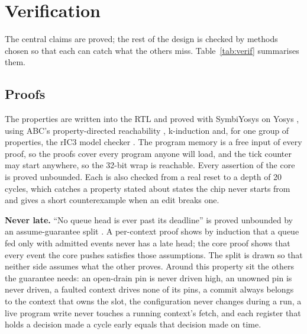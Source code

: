 \documentclass[conference,letterpaper]{IEEEtran}
\begin{document}
\section{Verification}
\label{sec:verif}

The central claims are proved; the rest of the design is checked by methods chosen so
that each can catch what the others miss. Table~\ref{tab:verif} summarises them.

\subsection{Proofs}

The properties are written into the RTL and proved with SymbiYosys \cite{sby} on Yosys
\cite{yosys}, using ABC's property-directed reachability \cite{abc,ic3,pdr}, k-induction
\cite{kinduction} and, for one group of properties, the rIC3 model checker \cite{ric3}.
The program memory is a free input of every proof, so the proofs cover every program
anyone will load, and the tick counter may start anywhere, so the 32-bit wrap is
reachable. Every assertion of the core is proved unbounded. Each is also checked from a
real reset to a depth of 20 cycles, which catches a property stated about states the
chip never starts from and gives a short counterexample when an edit breaks one.

\textbf{Never late.} ``No queue head is ever past its deadline'' is proved unbounded by an
assume-guarantee split \cite{assumeguarantee}. A per-context proof shows by induction
that a queue fed only with admitted events never has a late head; the core proof shows
that every event the core pushes satisfies those assumptions. The split is drawn so that
neither side assumes what the other proves. Around this property sit the others the
guarantee needs: an open-drain pin is never driven high, an unowned pin is never driven,
a faulted context drives none of its pins, a commit always belongs to the context that
owns the slot, the configuration never changes during a run, a live program write never
touches a running context's fetch, and each register that holds a decision made a cycle
early equals that decision made on time.
\end{document}
